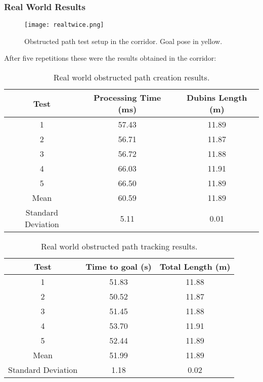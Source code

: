 \subsubsection{Real World Results}
\begin{figure}[h]
    \centering
    \texttt{[image: realtwice.png]}
    \caption{Obstructed path test setup in the corridor. Goal pose in yellow.}
    \label{fig:real_obstructed}
\end{figure}

After five repetitions these were the results obtained in the corridor:

\begin{table}[H]
    \centering
    \caption{Real world obstructed path creation results.}
    \begin{tabular}{|c|c|c|}
        \hline
        \textbf{Test} & \textbf{Processing Time (ms)} & \textbf{Dubins Length (m)} \\
        \hline
        1 & 57.43 & 11.89 \\
        \hline
        2 & 56.71 & 11.87 \\
        \hline
        3 & 56.72 & 11.88 \\
        \hline
        4 & 66.03 & 11.91 \\
        \hline
        5 & 66.50 & 11.89 \\
         \hline
        Mean & 60.59 & 11.89 \\
        \hline
        Standard Deviation & 5.11 & 0.01 \\
        \hline
    \end{tabular}
    \label{tab:obstructed_path_results3}
\end{table}
\begin{table}[H]
    \centering
    \caption{Real world obstructed path tracking results.}
    \begin{tabular}{|c|c|c|}
        \hline
        \textbf{Test} & \textbf{Time to goal (s)} & \textbf{Total Length (m)} \\
         \hline
         1 & 51.83 & 11.88 \\
         \hline
         2 & 50.52 & 11.87 \\
         \hline
         3 & 51.45 & 11.88 \\
         \hline
         4 & 53.70 & 11.91 \\
         \hline
         5 & 52.44 & 11.89 \\
         \hline
        Mean & 51.99 & 11.89 \\
        \hline
        Standard Deviation & 1.18 & 0.02 \\
        \hline
    \end{tabular}
    \label{tab:obstructed_path_results4}
\end{table}


